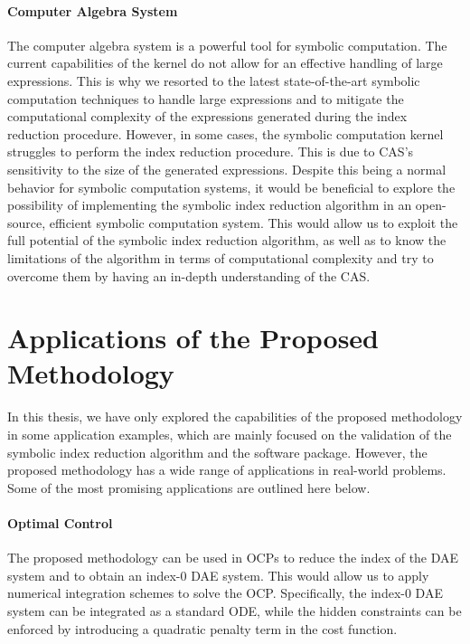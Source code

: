 \paragraph{Computer Algebra System}

The \Maple{} computer algebra system is a powerful tool for symbolic computation. The current capabilities of the \Maple{} kernel do not allow for an effective handling of large expressions. This is why we resorted to the latest state-of-the-art symbolic computation techniques to handle large expressions and to mitigate the computational complexity of the expressions generated during the index reduction procedure. However, in some cases, the \Maple{} symbolic computation kernel struggles to perform the index reduction procedure. This is due to \ac{CAS}'s sensitivity to the size of the generated expressions. Despite this being a normal behavior for symbolic computation systems, it would be beneficial to explore the possibility of implementing the symbolic index reduction algorithm in an open-source, efficient symbolic computation system. This would allow us to exploit the full potential of the symbolic index reduction algorithm, as well as to know the limitations of the algorithm in terms of computational complexity and try to overcome them by having an in-depth understanding of the \ac{CAS}.

\section{Applications of the Proposed Methodology}

In this thesis, we have only explored the capabilities of the proposed methodology in some application examples, which are mainly focused on the validation of the symbolic index reduction algorithm and the \Indigo{} software package. However, the proposed methodology has a wide range of applications in real-world problems. Some of the most promising applications are outlined here below.

\paragraph{Optimal Control}

The proposed methodology can be used in \acp{OCP} to reduce the index of the \ac{DAE} system and to obtain an index-0 \ac{DAE} system. This would allow us to apply numerical integration schemes to solve the \ac{OCP}. Specifically, the index-0 \ac{DAE} system can be integrated as a standard \ac{ODE}, while the hidden constraints can be enforced by introducing a quadratic penalty term in the cost function.

